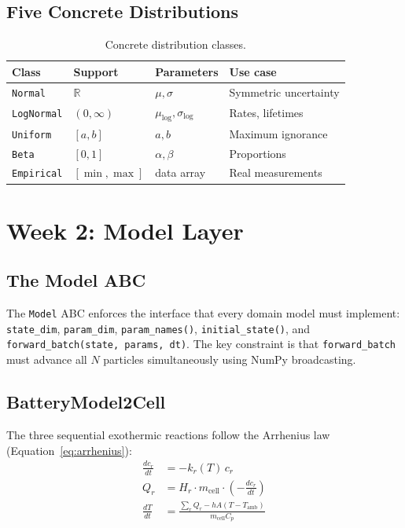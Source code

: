\documentclass[12pt,a4paper]{article}
\theoremstyle{plain}
\theoremstyle{definition}
\theoremstyle{remark}
\begin{document}
\subsection{Five Concrete Distributions}

\begin{table}[h]
\centering
\caption{Concrete distribution classes.}
\label{tab:distributions}
\begin{tabular}{lllp{4.5cm}}
\toprule
\textbf{Class} & \textbf{Support} & \textbf{Parameters}
  & \textbf{Use case} \\
\midrule
\texttt{Normal} & $\mathbb{R}$ & $\mu, \sigma$
  & Symmetric uncertainty \\
\texttt{LogNormal} & $(0,\infty)$ & $\mu_{\log}, \sigma_{\log}$
  & Rates, lifetimes \\
\texttt{Uniform} & $[a,b]$ & $a, b$
  & Maximum ignorance \\
\texttt{Beta} & $[0,1]$ & $\alpha, \beta$
  & Proportions \\
\texttt{Empirical} & $[\min,\max]$ & data array
  & Real measurements \\
\bottomrule
\end{tabular}
\end{table}

\section{Week 2: Model Layer}

\subsection{The Model ABC}

The \texttt{Model} ABC enforces the interface that every domain model
must implement:
\texttt{state\_dim}, \texttt{param\_dim}, \texttt{param\_names()},
\texttt{initial\_state()}, and \texttt{forward\_batch(state, params, dt)}.
The key constraint is that \texttt{forward\_batch} must advance all
$N$ particles simultaneously using NumPy broadcasting.

\subsection{BatteryModel2Cell}

The three sequential exothermic reactions follow the Arrhenius law
(Equation~\ref{eq:arrhenius}):
\begin{align}
  \frac{dc_r}{dt} &= -k_r(T)\, c_r \\
  Q_r &= H_r \cdot m_\text{cell} \cdot \left(-\frac{dc_r}{dt}\right) \\
  \frac{dT}{dt} &= \frac{\sum_r Q_r - hA(T - T_\text{amb})}
                        {m_\text{cell} C_p}
\end{align}
\end{document}

